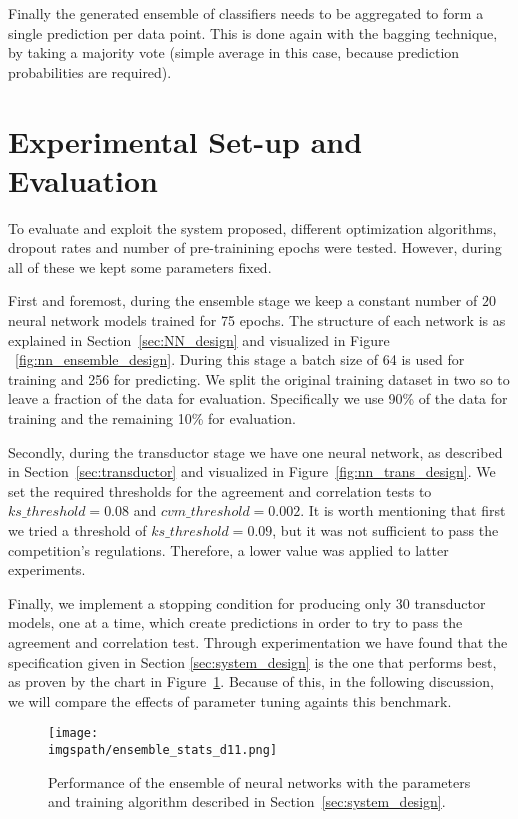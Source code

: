 \documentclass[conference]{IEEEtran}
\def\imgspath{./imgs}
\def\imgspath{../imgs}
\begin{document}
Finally the generated ensemble of classifiers needs to be aggregated to form a
single prediction per data point. This is done again with the bagging technique,
by taking a majority vote (simple average in this case, because prediction
probabilities are required).

\section{Experimental Set-up and Evaluation}
\label{sec:experiment}
To evaluate and exploit the system proposed, different optimization algorithms,
dropout rates and number of pre-trainining epochs were tested. However, during
all of these we kept some parameters fixed.

First and foremost, during the ensemble stage we keep a constant number of $20$
neural network models trained for 75 epochs. The structure of each network is as
explained in Section~\ref{sec:NN_design} and visualized in Figure
~\ref{fig:nn_ensemble_design}. During this stage a batch size of 64 is used for
training and 256 for predicting. We split the original training dataset in two
so to leave a fraction of the data for evaluation. Specifically we use 90\% of
the data for training and the remaining 10\% for evaluation.

Secondly, during the transductor stage we have one neural network, as described
in Section~\ref{sec:transductor} and visualized in
Figure~\ref{fig:nn_trans_design}. We set the required thresholds for the
agreement and correlation tests to $ks\_threshold = 0.08$ and $cvm\_threshold =
0.002$. It is worth mentioning that first we tried a threshold of $ks\_threshold =
0.09$, but it was not sufficient to pass the competition's regulations.
Therefore, a lower value was applied to latter experiments.

Finally, we implement a stopping condition for producing only $30$ transductor
models, one at a time, which create predictions in order to try to pass the
agreement and correlation test. Through experimentation we have found that the
specification given in Section \ref{sec:system_design} is the one that performs
best, as proven by the chart in Figure~\ref{fig:ensemble_d11}. Because of this,
in the following discussion, we will compare the effects of parameter tuning
againts this benchmark.


\begin{figure}[!ht]
	\centering
	\texttt{[image: \\imgspath/ensemble\_stats\_d11.png]}
	\caption{Performance of the ensemble of neural networks with the parameters
	and training algorithm described in Section~\ref{sec:system_design}.}
	\label{fig:ensemble_d11}
\end{figure}
\end{document}
